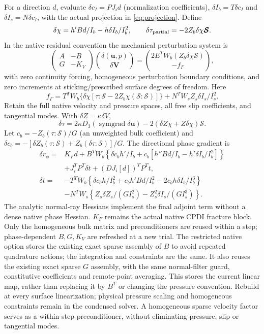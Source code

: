 \documentclass[11pt,a4paper]{article}
\newcommand{\Smat}{\bm{\mathcal S}}
\newcommand{\vect}[1]{\boldsymbol{#1}}
\begin{document}
For a direction $d$, evaluate $\delta c_I=P J_i d$ (normalization coefficients),
$\delta I_b=T\delta c_I$ and $\delta I_s=N\delta c_I$, with the actual projection
in \cref{eq:projection}. Define
\[
 \delta\chi=h'Bd/I_b-h\delta I_b/I_b^2,\qquad
 \delta\tau_{\rm partial}=-2Z_b\delta\chi\Smat.
\]
In the native residual convention the mechanical perturbation system is
\[
 \begin{pmatrix}A&-B\\G&-K_V\end{pmatrix}
 \binom{\delta(\bm u,p)}{\delta\vect V}
 =\binom{2E^TW_b(Z_b\delta\chi\Smat)}{-f_\Gamma},
\]
with zero continuity forcing, homogeneous perturbation boundary conditions,
and zero increments at sticking/prescribed surface degrees of freedom. Here
\[
 f_\Gamma=T^TW_b\{\delta\chi[\tau:\Smat-2Z_b\chi(\Smat:\Smat)]\}
              +N^TW_s Z_s\delta I_s/I_s^2.
\]
Retain the full native velocity and pressure spaces, all free slip coefficients,
and tangential modes. With $\delta Z=\kappa\delta V$,
\[
 \delta\tau=2\kappa D_3(\operatorname{symgrad}\delta\bm u)
             -2(\delta Z\chi+Z\delta\chi)\Smat.
\]
Let $c_b=-Z_b(\tau:\Smat)/G$ (an unweighted bulk coefficient) and
$\delta c_b=-[\delta Z_b(\tau:\Smat)+Z_b(\delta\tau:\Smat)]/G$.
The directional phase gradient is
\begin{align*}
 \delta r_\phi={}&K_Fd+
 B^TW_b\left\{\delta c_b h'/I_b+
 c_b[h''Bd/I_b-h'\delta I_b/I_b^2]\right\}\\
 &+J_i^TP^T\delta t+(D J_i[d])^TP^Tt,\\
 \delta t={}&-T^TW_b\left\{\delta c_b h/I_b^2+c_bh'Bd/I_b^2
                      -2c_bh\delta I_b/I_b^3\right\}\\
 &-N^TW_s\left\{Z_s\delta Z_s/(GI_s^2)
                         -Z_s^2\delta I_s/(GI_s^3)\right\}.
\end{align*}
The analytic normal-ray Hessians implement the final adjoint term without a
dense native phase Hessian. $K_F$ remains the actual native CPDI fracture block.
Only the homogeneous bulk matrix and preconditioners are reused within a step;
phase-dependent $B,G,K_V$ are refreshed at a new trial.
The restricted native option stores the existing exact sparse assembly of $B$
to avoid repeated quadrature actions; the integration and constraints are the
same. It also reuses the existing exact sparse $G$ assembly, with the same
normal-filter guard, constitutive coefficients and remote-point averaging.
This stores the current linear map, rather than replacing it by $B^T$ or
changing the pressure convention. Rebuild at every surface linearization;
physical pressure scaling and homogeneous constraints remain in the condensed
solver. A homogeneous sparse velocity factor serves as a within-step
preconditioner, without eliminating pressure, slip or tangential modes.
\end{document}
